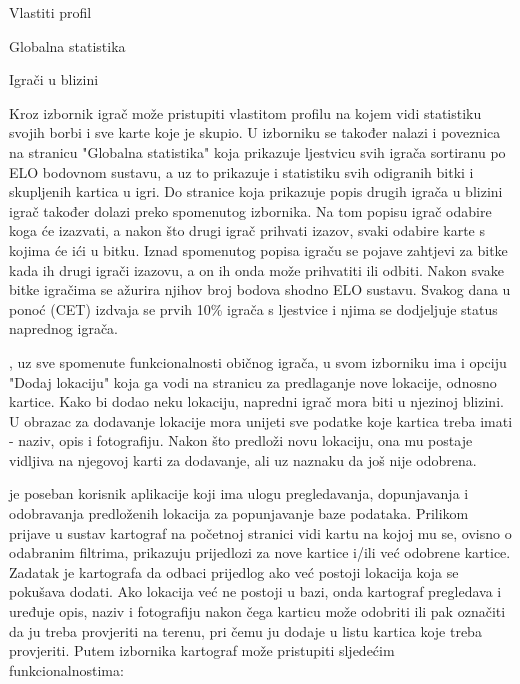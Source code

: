 		\begin{packed_item}
		    \item Vlastiti profil
		    \item Globalna statistika
		    \item Igrači u blizini
		\end{packed_item}
		
		Kroz izbornik igrač može pristupiti vlastitom profilu na kojem vidi statistiku svojih borbi i sve karte koje je skupio. U izborniku se također nalazi i poveznica na stranicu "Globalna statistika" koja prikazuje ljestvicu svih igrača sortiranu po ELO bodovnom sustavu, a uz to prikazuje i statistiku svih odigranih bitki i skupljenih kartica u igri. Do stranice koja prikazuje popis drugih igrača u blizini igrač također dolazi preko spomenutog izbornika. Na tom popisu igrač odabire koga će izazvati, a nakon što drugi igrač prihvati izazov, svaki odabire karte s kojima će ići u bitku. Iznad spomenutog popisa igraču se pojave zahtjevi za bitke kada ih drugi igrači izazovu, a on ih onda može prihvatiti ili odbiti. Nakon svake bitke igračima se ažurira njihov broj bodova shodno ELO sustavu. Svakog dana u ponoć (CET) izdvaja se prvih 10\% igrača s ljestvice i njima se dodjeljuje status naprednog igrača.
		
		, uz sve spomenute funkcionalnosti običnog igrača, u svom izborniku ima i opciju "Dodaj lokaciju" koja ga vodi na stranicu za predlaganje nove lokacije, odnosno kartice. Kako bi dodao neku lokaciju, napredni igrač mora biti u njezinoj blizini. U obrazac za dodavanje lokacije mora unijeti sve podatke koje kartica treba imati - naziv, opis i fotografiju. Nakon što predloži novu lokaciju, ona mu postaje vidljiva na njegovoj karti za dodavanje, ali uz naznaku da još nije odobrena.
		
		 je poseban korisnik aplikacije koji ima ulogu pregledavanja, dopunjavanja i odobravanja predloženih lokacija za popunjavanje baze podataka. Prilikom prijave u sustav kartograf na početnoj stranici vidi kartu na kojoj mu se, ovisno o odabranim filtrima, prikazuju prijedlozi za nove kartice i/ili već odobrene kartice. Zadatak je kartografa da odbaci prijedlog ako već postoji lokacija koja se pokušava dodati. Ako lokacija već ne postoji u bazi, onda kartograf pregledava i uređuje opis, naziv i fotografiju nakon čega karticu može odobriti ili pak označiti da ju treba provjeriti na terenu, pri čemu ju dodaje u listu kartica koje treba provjeriti. Putem izbornika kartograf može pristupiti sljedećim funkcionalnostima:
		

